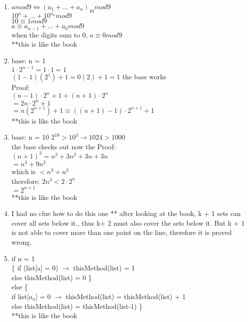 \documentclass{article}
\begin{document}
\begin{enumerate}
  \item $a mod 9 \iff (a_1 + \dots + a_n)_{10} mod 9$ \\
	$10^a + \dots + 10^{a_n} mod 9$ \\
	$10 \equiv 1 mod 9$ \\
	$a \equiv a_{n-1} + \dots + a_0 mod 9$ \\
	when the digits sum to 0, $ a \equiv 0 mod 9$ \\
	**this is like the book

  \item base: n = 1 \\
	$1 \cdot 2^{n-1} = 1 \cdot 1 = 1$ \\
	$(1-1)(2^1)+1 = 0(2)+1 = 1$ the base works \\
	Proof: \\
	$(n-1) \cdot 2^n +1 +(n+1) \cdot 2^n$ \\
	$= 2n \cdot 2^n +1$ \\
	$= n(2^{n+1})+1 \equiv ((n+1)-1) \cdot 2^{n+1} +1$ \\
	**this is like the book

  \item base: n = 10 $2^10 > 10^3 \rightarrow 1024 > 1000$ \\
	the base checks out now the Proof: \\
	$(n+1)^3 = n^3+3n^2+3n+3n$ \\
	$=n^3+9n^2$ \\
	which is $<n^3 +n^3$ \\
	therefore: $2n^3 < 2 \cdot 2^n$ \\
	$=2^{n+1}$ \\
	**this is like the book

  \item I had no clue how to do this one
	** after looking at the book, k + 1 sets can cover all sets below it., thus k+ 2 must also cover the sets below it.  But k + 1 is not able to cover more than one point on the line, therefore it is proved wrong.

  \item if n = 1 \\
	  \{ if (list[a] = 0) $\rightarrow$ thisMethod(list) = 1 \\
	     else thisMethod(list) = 0 	\}  \\
	 else \{ \\
	   if list[$a_n$] = 0 $\rightarrow$ thisMethod(list) = thisMethod(list) + 1\\
	   else thisMethod(list) = thisMethod(list-1) \} \\
	**this is like the book


\end{enumerate}
\end{document}
